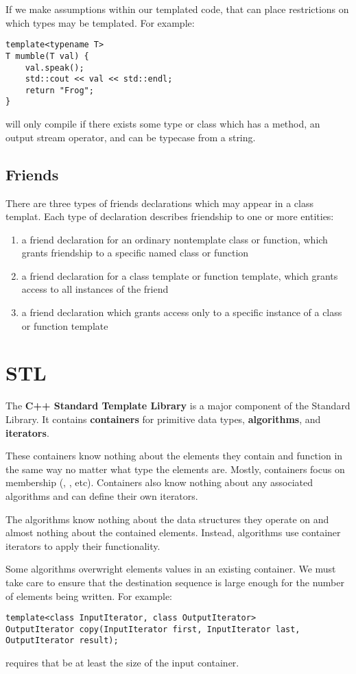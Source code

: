 \documentclass[12pt]{article}
\begin{document}
If we make assumptions within our templated code, that can place restrictions on which types may be templated. For example:
\begin{verbatim}
template<typename T>
T mumble(T val) {
    val.speak();
    std::cout << val << std::endl;
    return "Frog";
}
\end{verbatim}
will only compile if there exists some type or class which has a  method, an output stream operator, and can be typecase from a string.

\subsection{Friends}
There are three types of friends declarations which may appear in a class templat. Each type of declaration describes friendship to one or more entities:
\begin{enumerate}
\item a friend declaration for an ordinary nontemplate class or function, which grants friendship to a specific named class or function
\item a friend declaration for a class template or function template, which grants access to all instances of the friend
\item a friend declaration which grants access only to a specific instance of a class or function template
\end{enumerate}

\section{STL}
The {\bf C++ Standard Template Library} is a major component of the Standard Library. It contains {\bf containers} for primitive data types, {\bf algorithms}, and {\bf iterators}.

These containers know nothing about the elements they contain and function in the same way no matter what type the elements are. Mostly, containers focus on membership (, , etc). Containers also know nothing about any associated algorithms and can define their own iterators.

The algorithms know nothing about the data structures they operate on and almost nothing about the contained elements. Instead, algorithms use container iterators to apply their functionality.

Some algorithms overwright elements values in an existing container. We must take care to ensure that the destination sequence is large enough for the number of elements being written. For example:
\begin{verbatim}
template<class InputIterator, class OutputIterator>
OutputIterator copy(InputIterator first, InputIterator last, OutputIterator result);
\end{verbatim}
requires that  be at least the size of the input container.
\end{document}
